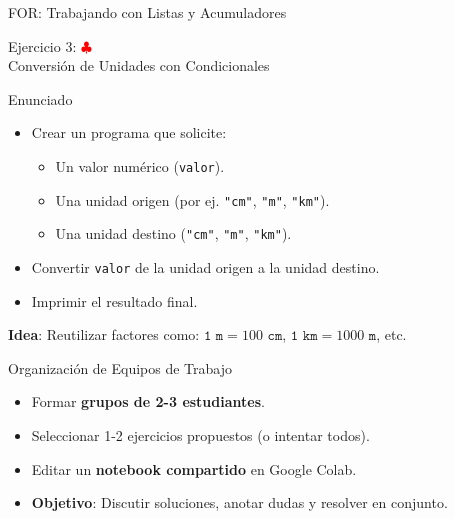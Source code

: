 \documentclass[10pt]{beamer}
\begin{document}
\begin{frame}[fragile]{FOR: Trabajando con Listas y Acumuladores}
\begin{frame}{Ejercicio 3: \hfill \textcolor{red}{$\clubsuit$} \\ Conversión de Unidades con Condicionales}
  \begin{block}{Enunciado}
    \begin{itemize}
      \item Crear un programa que solicite:
        \begin{itemize}
          \item Un valor numérico (\texttt{valor}).
          \item Una unidad origen (por ej. \texttt{"cm"}, \texttt{"m"}, \texttt{"km"}).
          \item Una unidad destino (\texttt{"cm"}, \texttt{"m"}, \texttt{"km"}).
        \end{itemize}
      \item Convertir \texttt{valor} de la unidad origen a la unidad destino.
      \item Imprimir el resultado final.
    \end{itemize}
  \end{block}
  \textbf{Idea}: Reutilizar factores como: \(\texttt{1 m} = 100 \texttt{ cm}\), \(\texttt{1 km} = 1000 \texttt{ m}\), etc.
\end{frame}

\begin{frame}{Organización de Equipos de Trabajo}
  \begin{itemize}
    \item Formar \textbf{grupos de 2-3 estudiantes}.
    \item Seleccionar 1-2 ejercicios propuestos (o intentar todos).
    \item Editar un \textbf{notebook compartido} en Google Colab.
    \item \textbf{Objetivo}: Discutir soluciones, anotar dudas y resolver en conjunto.
  \end{itemize}
\end{frame}


\end{frame}
\end{document}
